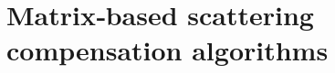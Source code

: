 \documentclass[12pt]{article}
\begin{document}

\section{Matrix‑based scattering compensation algorithms}
\label{supsec:algorithms}
\end{document}
